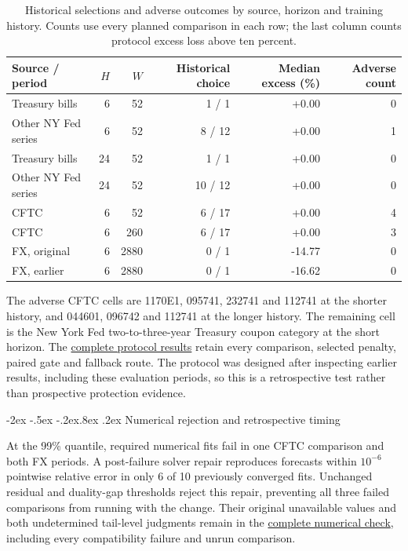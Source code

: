 \documentclass[12pt,a4paper]{article}
\makeatletter
\renewcommand\section{\@startsection{section}{1}{\z@}%
  {-2ex \@plus -.5ex \@minus -.2ex}{.8ex \@plus .2ex}%
  {\normalfont\large\bfseries}}
\makeatother
\begin{document}
\begin{table}[!htbp]\centering\footnotesize\setlength{\tabcolsep}{4pt}
\caption{Historical selections and adverse outcomes by source, horizon and training history. Counts use every planned comparison in each row; the last column counts protocol excess loss above ten percent.}\label{tab:v13-routing}
\begin{tabular}{lrrr rr}\toprule
Source / period & $H$ & $W$ & Historical choice & Median excess (\%) & Adverse count\\\midrule
Treasury bills & 6 & 52 & 1 / 1 & +0.00 & 0 \\
Other NY Fed series & 6 & 52 & 8 / 12 & +0.00 & 1 \\
Treasury bills & 24 & 52 & 1 / 1 & +0.00 & 0 \\
Other NY Fed series & 24 & 52 & 10 / 12 & +0.00 & 0 \\
CFTC & 6 & 52 & 6 / 17 & +0.00 & 4 \\
CFTC & 6 & 260 & 6 / 17 & +0.00 & 3 \\
FX, original & 6 & 2880 & 0 / 1 & -14.77 & 0 \\
FX, earlier & 6 & 2880 & 0 / 1 & -16.62 & 0 \\
\bottomrule\end{tabular}
\end{table}

The adverse CFTC cells are 1170E1, 095741, 232741 and 112741 at the shorter history, and 044601, 096742 and 112741 at the longer history. The remaining cell is the New York Fed two-to-three-year Treasury coupon category at the short horizon. The \href{https://github.com/ByronLi0207/financial-mathematics-paper-20261020/tree/revision-v13/results/v13/recommended-protocol}{complete protocol results} retain every comparison, selected penalty, paired gate and fallback route. The protocol was designed after inspecting earlier results, including these evaluation periods, so this is a retrospective test rather than prospective protection evidence.

\FloatBarrier


\section{Numerical rejection and retrospective timing}\label{sup:wp5}\label{sup:reproduction}\label{sup:v12-details}

At the 99\% quantile, required numerical fits fail in one CFTC comparison and both FX periods. A post-failure solver repair reproduces forecasts within $10^{-6}$ pointwise relative error in only 6 of 10 previously converged fits. Unchanged residual and duality-gap thresholds reject this repair, preventing all three failed comparisons from running with the change. Their original unavailable values and both undetermined tail-level judgments remain in the \href{https://github.com/ByronLi0207/financial-mathematics-paper-20261020/tree/revision-v13/results/v13/tau-repair}{complete numerical check}, including every compatibility failure and unrun comparison.
\end{document}
